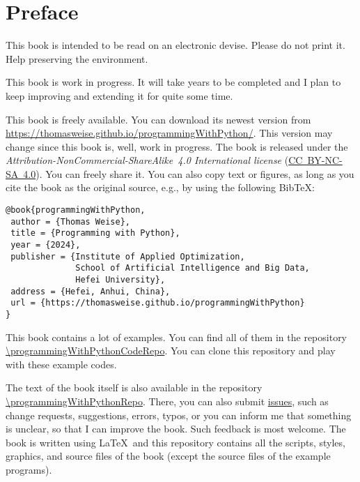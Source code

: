 \chapter*{Preface}%
%
%
This book is intended to be read on an electronic devise.
Please do not print it.
Help preserving the environment.

This book is work in progress.
It will take years to be completed and I plan to keep improving and extending it for quite some time.

This book is freely available.
You can download its newest version from \url{https://thomasweise.github.io/programmingWithPython/}.
This version may change since this book is, well, work in progress.
The book is released under the \emph{Attribution-NonCommercial-ShareAlike~4.0 International license} (\href{http://creativecommons.org/licenses/by-nc-sa/4.0/}{\mbox{CC~BY-NC-SA~4.0}}).
You can freely share it.
You can also copy text or figures, as long as you cite the book as the original source, e.g., by using the following Bib\TeX:%
%
\begin{lstlisting}[style=text_style]
@book{programmingWithPython,
 author = {Thomas Weise},
 title = {Programming with Python},
 year = {2024},
 publisher = {Institute of Applied Optimization,
              School of Artificial Intelligence and Big Data,
              Hefei University},
 address = {Hefei, Anhui, China},
 url = {https://thomasweise.github.io/programmingWithPython}
}
\end{lstlisting}
%
This book contains a lot of examples.
You can find all of them in the repository \url{\programmingWithPythonCodeRepo}.
You can clone this repository and play with these example codes.%
%
\begin{sloppypar}%
The text of the book itself is also available in the repository \url{\programmingWithPythonRepo}.
There, you can also submit \href{\programmingWithPythonRepo/issues}{issues}, such as change requests, suggestions, errors, typos, or you can inform me that something is unclear, so that I can improve the book.
Such feedback is most welcome.
The book is written using \LaTeX\ and this repository contains all the scripts, styles, graphics, and source files of the book (except the source files of the example programs).%
\end{sloppypar}%
%
\strut\vfill\strut%
%
%
